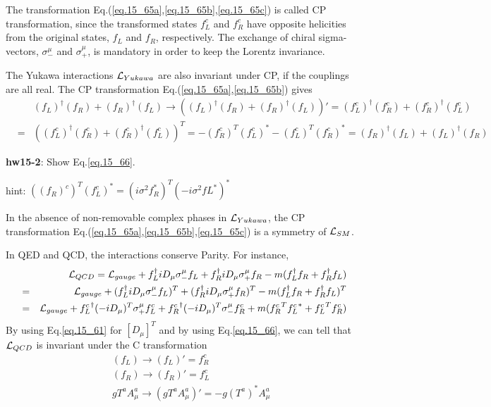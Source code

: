 \documentclass[12pt]{article}
\begin{document}
{  The transformation Eq.(\ref{eq.15_65a},\ref{eq.15_65b},\ref{eq.15_65c}) is called CP transformation, since the transformed states $f_L^c$ and $f_R^c$ have opposite helicities from the original states, $f_L$ and $f_R$, respectively.  The exchange of chiral sigma-vectors, $\sigma_-^\mu$ and $\sigma_+^\mu$, is mandatory in order to keep the Lorentz invariance.

  The Yukawa interactions ${\cal L}_{Yukawa}$ are also invariant under CP, if
  the couplings are all real. The CP transformation Eq.(\ref{eq.15_65a},\ref{eq.15_65b}) gives
\begin{eqnarray}
  &&(f_L)^\dagger (f_R)      + (f_R)^\dagger (f_L)
   \to ( (f_L)^\dagger (f_R)     + (f_R)^\dagger (f_L) )'
   =   (f_L^c)^\dagger (f_R^c) + (f_R^c)^\dagger (f_L^c) \nonumber \\
   &=& ( (f_L^c)^\dagger (f_R^c) + (f_R^c)^\dagger (f_L^c) )^T 
   = - (f_R^c)^T (f_L^c)^*  - (f_L^c)^T (f_R^c)^* 
   =   (f_R)^\dagger (f_L)     + (f_L)^\dagger (f_R)  \label{eq.15_66}
\end{eqnarray}

{\bf hw15-2}: Show Eq.\ref{eq.15_66}.

hint: $((f_R)^c)^T (f_L^c)^* = (i\sigma^2 f_R^*)^T (-i\sigma^2 fL^*)^*$

  In the absence of non-removable complex phases in ${\cal L}_{Yukawa}$, the
  CP transformation Eq.(\ref{eq.15_65a},\ref{eq.15_65b},\ref{eq.15_65c}) is a symmetry of ${\cal L}_{SM}$.

  In QED and QCD, the interactions conserve Parity.  For instance,
  \begin{eqnarray}
    &&{\cal L}_{QCD}
    = {\cal L}_{gauge} + f_L^\dagger iD_\mu \sigma_-^\mu f_L
                + f_R^\dagger iD_\mu \sigma_+^\mu f_R
                - m ( f_L^\dagger f_R + f_R^\dagger f_L ) \nonumber \\
    &=& {\cal L}_{gauge} + ( f_L^\dagger iD_\mu \sigma_-^\mu f_L )^T
                + ( f_R^\dagger iD_\mu \sigma_+^\mu f_R )^T
                - m ( f_L^\dagger f_R + f_R^\dagger f_L )^T \nonumber \\
    &=& {\cal L}_{gauge} + {f_L^c}^\dagger (-iD_\mu)^T \sigma_+^\mu f_L^c
                + {f_R^c}^\dagger (-iD_\mu)^T \sigma_-^\mu f_R^c
                + m ( {f_R^c}^T {f_L^c}^*  + {f_L^c}^T {f_R^c} ) \label{eq.15_67}
\end{eqnarray}
   By using Eq.\ref{eq.15_61} for $[D_\mu]^T$ and by using Eq.\ref{eq.15_66}, we can tell that ${\cal L}_{QCD}$ is invariant under the C transformation
\begin{eqnarray}
  && (f_L) \to (f_L)' = f_R^c \label{eq.15_68a} \\
  && (f_R) \to (f_R)' = f_L^c \label{eq.15_68b} \\
  && g T^a A^a_\mu \to (g T^a A^a_\mu)' = -g (T^a)^* A^a_\mu \label{eq.15_68c} 
\end{eqnarray}
  
}
\end{document}
